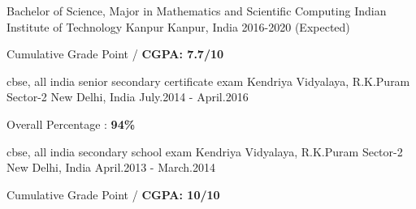 \begin{cventries}
  \cventry
    {Bachelor of Science, Major in Mathematics and Scientific Computing }
    {Indian Institute of Technology Kanpur}
    {Kanpur, India}
    {2016-2020 (Expected)}
    {
      \begin{cvitems}
        \item {Cumulative Grade Point / \textbf{CGPA: 7.7/10}}
      \end{cvitems}
    }
    
  \cventry
    {cbse, all india senior secondary certificate exam}
    {Kendriya Vidyalaya, R.K.Puram Sector-2}
    {New Delhi, India}
    {July.2014 - April.2016}
    {
      \begin{cvitems}
        \item {Overall Percentage : \textbf{94\%}}
      \end{cvitems}
    }

  \cventry
    {cbse, all india secondary school exam}
    {Kendriya Vidyalaya, R.K.Puram Sector-2}
    {New Delhi, India}
    {April.2013 - March.2014}
    {
      \begin{cvitems}
        \item {Cumulative Grade Point / \textbf{CGPA: 10/10}}
      \end{cvitems}
    }
    
\end{cventries}
